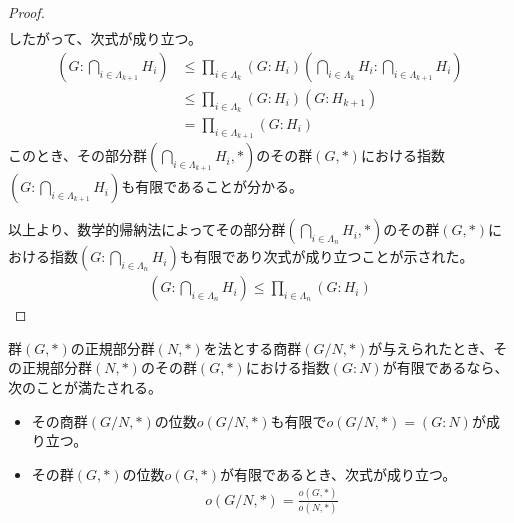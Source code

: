 \documentclass[dvipdfmx]{jsarticle}
\begin{document}
\begin{proof}
\begin{align*}
\end{align*}
したがって、次式が成り立つ。
\begin{align*}
\left( G:\bigcap_{i \in \varLambda_{k + 1}} H_{i} \right) &\leq \prod_{i \in \varLambda_{k}} \left( G:H_{i} \right)\left( \bigcap_{i \in \varLambda_{k}} H_{i}:\bigcap_{i \in \varLambda_{k + 1}} H_{i} \right)\\
&\leq \prod_{i \in \varLambda_{k}} \left( G:H_{i} \right)\left( G:H_{k + 1} \right)\\
&= \prod_{i \in \varLambda_{k + 1}} \left( G:H_{i} \right)
\end{align*}
このとき、その部分群$\left( \bigcap_{i \in \varLambda_{k + 1}} H_{i},* \right)$のその群$(G,*)$における指数$\left( G:\bigcap_{i \in \varLambda_{k + 1}} H_{i} \right)$も有限であることが分かる。\par
以上より、数学的帰納法によってその部分群$\left( \bigcap_{i \in \varLambda_{n}} H_{i},* \right)$のその群$(G,*)$における指数$\left( G:\bigcap_{i \in \varLambda_{n}} H_{i} \right)$も有限であり次式が成り立つことが示された。
\begin{align*}
\left( G:\bigcap_{i \in \varLambda_{n}} H_{i} \right) \leq \prod_{i \in \varLambda_{n}} \left( G:H_{i} \right)
\end{align*}
\end{proof}
\begin{thm}\label{3.1.1.39}
群$(G,*)$の正規部分群$(N,*)$を法とする商群$\left( {G}/{N},* \right)$が与えられたとき、その正規部分群$(N,*)$のその群$(G,*)$における指数$(G:N)$が有限であるなら、次のことが満たされる。
\begin{itemize}
\item
  その商群$\left( {G}/{N},* \right)$の位数$o\left( {G}/{N},* \right)$も有限で$o\left( {G}/{N},* \right) = (G:N)$が成り立つ。
\item
  その群$(G,*)$の位数$o(G,*)$が有限であるとき、次式が成り立つ。
\begin{align*}
o\left( {G}/{N},* \right) = \frac{o(G,*)}{o(N,*)}
\end{align*}
\end{itemize}
\end{thm}
\end{document}
